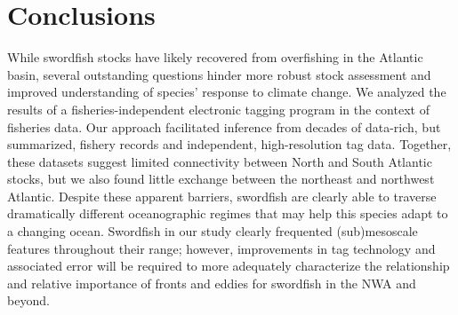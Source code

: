 \section{Conclusions}

While swordfish stocks have likely recovered from overfishing in the Atlantic basin, several outstanding questions hinder more robust stock assessment and improved understanding of species' response to climate change. We analyzed the results of a fisheries-independent electronic tagging program in the context of fisheries data. Our approach facilitated inference from decades of data-rich, but summarized, fishery records and independent, high-resolution tag data. Together, these datasets suggest limited connectivity between North and South Atlantic stocks, but we also found little exchange between the northeast and northwest Atlantic. Despite these apparent barriers, swordfish are clearly able to traverse dramatically different oceanographic regimes that may help this species adapt to a changing ocean. Swordfish in our study clearly frequented (sub)mesoscale features throughout their range; however, improvements in tag technology and associated error will be required to more adequately characterize the relationship and relative importance of fronts and eddies for swordfish in the NWA and beyond.
